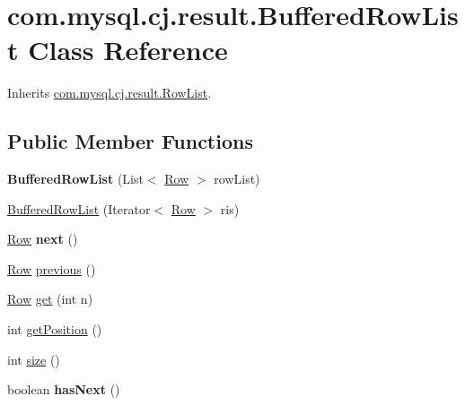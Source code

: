 \hypertarget{classcom_1_1mysql_1_1cj_1_1result_1_1_buffered_row_list}{}\section{com.\+mysql.\+cj.\+result.\+Buffered\+Row\+List Class Reference}
\label{classcom_1_1mysql_1_1cj_1_1result_1_1_buffered_row_list}


Inherits \mbox{\hyperlink{interfacecom_1_1mysql_1_1cj_1_1result_1_1_row_list}{com.\+mysql.\+cj.\+result.\+Row\+List}}.

\subsection*{Public Member Functions}
\begin{DoxyCompactItemize}
\item 
\mbox{\label{classcom_1_1mysql_1_1cj_1_1result_1_1_buffered_row_list_a605b13d1f1b48c03e7273e186b536a3a}} 
{\bfseries Buffered\+Row\+List} (List$<$ \mbox{\hyperlink{interfacecom_1_1mysql_1_1cj_1_1result_1_1_row}{Row}} $>$ row\+List)
\item 
\mbox{\hyperlink{classcom_1_1mysql_1_1cj_1_1result_1_1_buffered_row_list_acced249ad4e80088c1ac7694ffcd52a4}{Buffered\+Row\+List}} (Iterator$<$ \mbox{\hyperlink{interfacecom_1_1mysql_1_1cj_1_1result_1_1_row}{Row}} $>$ ris)
\item 
\mbox{\label{classcom_1_1mysql_1_1cj_1_1result_1_1_buffered_row_list_a70515abfd1dfda3133082fcde4e61aee}} 
\mbox{\hyperlink{interfacecom_1_1mysql_1_1cj_1_1result_1_1_row}{Row}} {\bfseries next} ()
\item 
\mbox{\hyperlink{interfacecom_1_1mysql_1_1cj_1_1result_1_1_row}{Row}} \mbox{\hyperlink{classcom_1_1mysql_1_1cj_1_1result_1_1_buffered_row_list_a899cd7f256715f653cb2faa2d8026491}{previous}} ()
\item 
\mbox{\hyperlink{interfacecom_1_1mysql_1_1cj_1_1result_1_1_row}{Row}} \mbox{\hyperlink{classcom_1_1mysql_1_1cj_1_1result_1_1_buffered_row_list_a84d3adb0ccd22e7ea988a25a6421948a}{get}} (int n)
\item 
int \mbox{\hyperlink{classcom_1_1mysql_1_1cj_1_1result_1_1_buffered_row_list_a6d18ed3e3cf3ebced974d1cd7d8ca9ec}{get\+Position}} ()
\item 
int \mbox{\hyperlink{classcom_1_1mysql_1_1cj_1_1result_1_1_buffered_row_list_a237ee911857a3afeb8641811508bb5b9}{size}} ()
\item 
\mbox{\label{classcom_1_1mysql_1_1cj_1_1result_1_1_buffered_row_list_a66307a61a8611cb5c0d584157b3afe30}} 
boolean {\bfseries has\+Next} ()
\end{DoxyCompactItemize}
